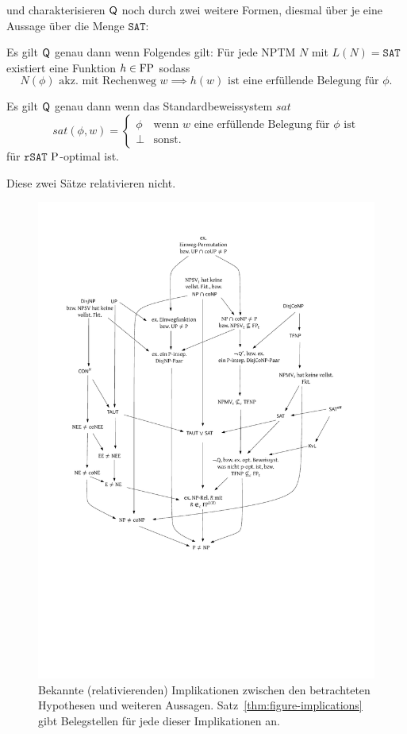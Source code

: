 \textcite{fenner_inverting_2003} und \textcite{kobler_is_2000} charakterisieren $\hQ$ noch durch zwei weitere Formen, diesmal über je eine Aussage über die Menge $\mathtt{SAT}$:

\begin{theorem}\label{thm:q-fenner}
    Es gilt $\hQ$ genau dann wenn Folgendes gilt: Für jede NPTM $N$ mit $L(N)=\mathtt{SAT}$ existiert eine Funktion $h\in \FP$ sodass 
\[ N(\phi) \text{ akz. mit Rechenweg $w$} \implies \text{$h(w)$ ist eine erfüllende Belegung für $\phi$.} \]
\end{theorem}
\begin{theorem}\label{thm:q-messner}
    Es gilt $\hQ$ genau dann wenn das Standardbeweissystem $\mathit{sat}$
            \[ \mathit{sat}(\phi, w) = \begin{cases} \phi & \text{wenn $w$ eine erfüllende Belegung für $\phi$ ist} \\ \bot & \text{sonst.} \end{cases}\]
            für $\mathtt{rSAT}$ $\P$-optimal ist.
\end{theorem}
Diese zwei Sätze relativieren nicht.

\begin{figure}[p]
    \includegraphics[page=1]{figures.pdf}
    \caption{Bekannte (relativierenden) Implikationen zwischen den betrachteten Hypothesen und weiteren Aussagen. Satz~\ref{thm:figure-implications} gibt Belegstellen für jede dieser Implikationen an.}\label{fig:figure-implications}
    \forcerectofloat
\end{figure}

